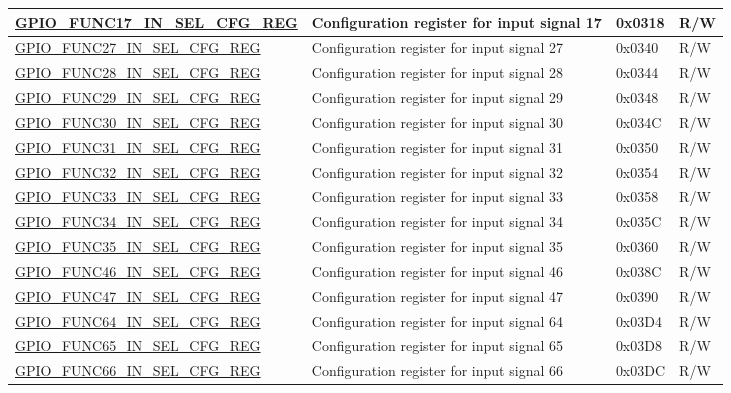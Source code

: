 \begin{longtable}{ | p{5.5cm} | p{6.2cm} | p{1.3cm} | p{2cm} | }
\hyperref[regdesc:GPIOFUNCMINSELCFGREG]{GPIO\_FUNC17\_IN\_SEL\_CFG\_REG} & Configuration register for input signal 17 & 0x0318 & R/W \\ \hline
\hyperref[regdesc:GPIOFUNCPINSELCFGREG]{GPIO\_FUNC27\_IN\_SEL\_CFG\_REG} & Configuration register for input signal 27 & 0x0340 & R/W \\ \hline
\hyperref[regdesc:GPIOFUNCPINSELCFGREG]{GPIO\_FUNC28\_IN\_SEL\_CFG\_REG} & Configuration register for input signal 28 & 0x0344 & R/W \\ \hline
\hyperref[regdesc:GPIOFUNCPINSELCFGREG]{GPIO\_FUNC29\_IN\_SEL\_CFG\_REG} & Configuration register for input signal 29 & 0x0348 & R/W \\ \hline
\hyperref[regdesc:GPIOFUNCPINSELCFGREG]{GPIO\_FUNC30\_IN\_SEL\_CFG\_REG} & Configuration register for input signal 30 & 0x034C & R/W \\ \hline
\hyperref[regdesc:GPIOFUNCPINSELCFGREG]{GPIO\_FUNC31\_IN\_SEL\_CFG\_REG} & Configuration register for input signal 31 & 0x0350 & R/W \\ \hline
\hyperref[regdesc:GPIOFUNCPINSELCFGREG]{GPIO\_FUNC32\_IN\_SEL\_CFG\_REG} & Configuration register for input signal 32 & 0x0354 & R/W \\ \hline
\hyperref[regdesc:GPIOFUNCPINSELCFGREG]{GPIO\_FUNC33\_IN\_SEL\_CFG\_REG} & Configuration register for input signal 33 & 0x0358 & R/W \\ \hline
\hyperref[regdesc:GPIOFUNCPINSELCFGREG]{GPIO\_FUNC34\_IN\_SEL\_CFG\_REG} & Configuration register for input signal 34 & 0x035C & R/W \\ \hline
\hyperref[regdesc:GPIOFUNCPINSELCFGREG]{GPIO\_FUNC35\_IN\_SEL\_CFG\_REG} & Configuration register for input signal 35 & 0x0360 & R/W \\ \hline
\hyperref[regdesc:GPIOFUNCQINSELCFGREG]{GPIO\_FUNC46\_IN\_SEL\_CFG\_REG} & Configuration register for input signal 46 & 0x038C & R/W \\ \hline
\hyperref[regdesc:GPIOFUNCQINSELCFGREG]{GPIO\_FUNC47\_IN\_SEL\_CFG\_REG} & Configuration register for input signal 47 & 0x0390 & R/W \\ \hline
\hyperref[regdesc:GPIOFUNCRINSELCFGREG]{GPIO\_FUNC64\_IN\_SEL\_CFG\_REG} & Configuration register for input signal 64 & 0x03D4 & R/W \\ \hline
\hyperref[regdesc:GPIOFUNCRINSELCFGREG]{GPIO\_FUNC65\_IN\_SEL\_CFG\_REG} & Configuration register for input signal 65 & 0x03D8 & R/W \\ \hline
\hyperref[regdesc:GPIOFUNCRINSELCFGREG]{GPIO\_FUNC66\_IN\_SEL\_CFG\_REG} & Configuration register for input signal 66 & 0x03DC & R/W \\ \hline

\end{longtable}
